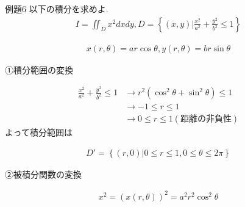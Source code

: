 \documentclass[a4paper,12pt]{jlreq}
\begin{document}
\begin{itembox}[l]{例題6}
以下の積分を求めよ.
\begin{align*}
    I = \iint_{D}^{} x^2 dx dy , D = \left\{(x,y)|\frac{x^2}{a^2} + \frac{y^2}{b^2} \le 1 \right\}
\end{align*}
\end{itembox}

\par
\begin{align*}
    x(r,\theta) = ar\cos\theta, y(r,\theta) = br\sin\theta
\end{align*}

①積分範囲の変換

\begin{align*}
    \frac{x^2}{a^2} + \frac{y^2}{b^2} \le 1 &\rightarrow r^2 (\cos^2 \theta + \sin^2 \theta) \le 1\\
                                            &\rightarrow -1 \le r \le 1\\
                                            &\rightarrow 0 \le r \le 1　(\text{距離の非負性})
\end{align*}
よって積分範囲は

\begin{align*}
    D' = \left\{{(r,0)| 0 \le r \le 1, 0 \le \theta \le 2\pi}\right\}
\end{align*}

②被積分関数の変換\par

\begin{align*}
    x^2 = (x(r,\theta))^2 = a^2 r^2 \cos^2 \theta
\end{align*}
\end{document}
